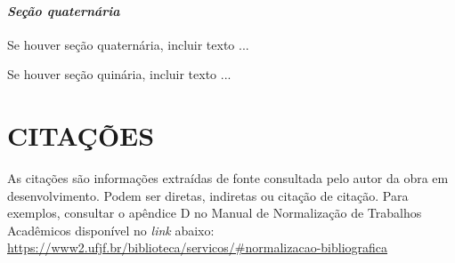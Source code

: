 \documentclass[
  oneside, %
  english,
  brazil
]{abntbibufjf}
\begin{document}








\subsubsection{\textit{Seção quaternária}}

Se houver seção quaternária, incluir texto ...



Se houver seção quinária, incluir texto ...



\chapter{CITAÇÕES}

As citações são informações extraídas de fonte consultada pelo autor da obra em desenvolvimento.
Podem ser diretas, indiretas ou citação de citação.
Para exemplos, consultar o apêndice D no Manual de Normalização de Trabalhos Acadêmicos disponível no \textit{link} abaixo:\\
\url{https://www2.ufjf.br/biblioteca/servicos/#normalizacao-bibliografica}


\end{document}
